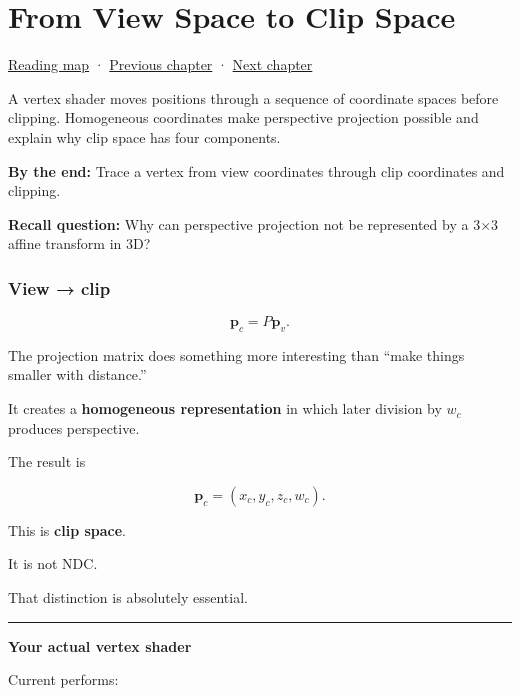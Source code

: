 \chapter{From View Space to Clip Space}\label{03-visual-computing-i-ch013-from-view-space-to-clip-space}\hypertarget{03-visual-computing-i-ch013}{}\label{stagechapter:03-visual-computing-i-ch013}

\hypertarget{03-visual-computing-i-ch013-from-view-space-to-clip-space}{}

\hyperref[volume-reading-map]{Reading map} · \hyperref[03-visual-computing-i-ch004]{Previous chapter} · \hyperref[06-engine-ii-ch030]{Next chapter}

A vertex shader moves positions through a sequence of coordinate spaces before clipping. Homogeneous coordinates make perspective projection possible and explain why clip space has four components.

\textbf{By the end:} Trace a vertex from view coordinates through clip coordinates and clipping.

\textbf{Recall question:} Why can perspective projection not be represented by a 3×3 affine transform in 3D?

\subsection{View → clip}\label{03-visual-computing-i-ch013-view-clip}

\hypertarget{03-visual-computing-i-ch013-view-clip}{}

\[
\mathbf p_c=P\mathbf p_v.
\]

The projection matrix does something more interesting than ``make things smaller with distance.''

It creates a \textbf{homogeneous representation} in which later division by \(w_c\) produces perspective.

The result is

\[
\mathbf p_c=
(x_c,y_c,z_c,w_c).
\]

This is \textbf{clip space}.

It is not NDC.

That distinction is absolutely essential.

\begin{center}\rule{0.5\linewidth}{0.5pt}\end{center}

\textbf{Your actual vertex shader}

Current  performs:

